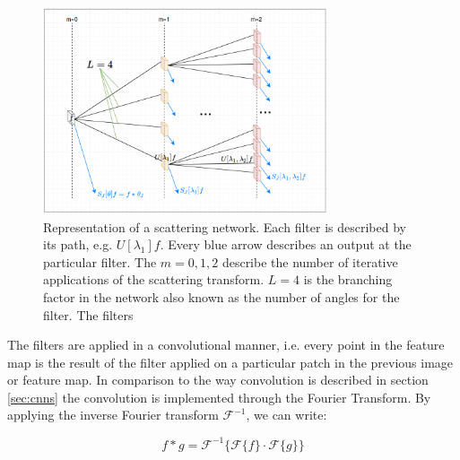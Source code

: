 \begin{figure}[!htb]
	\centering
	\includegraphics[width = 0.75\textwidth]{images/scattering_network_overview.png}
	\caption{Representation of a scattering network. Each filter is described by its path, e.g. $U[\lambda_1]f$. Every blue arrow describes an output at the particular filter. The $m=0,1,2$ describe the number of iterative applications of the scattering transform. $L=4$ is the branching factor in the network also known as the number of angles for the filter. The filters}
	\label{fig:scattering_network}
\end{figure}

The filters are applied in a convolutional manner, i.e. every point in the feature map is the result of the filter applied on a particular patch in the previous image or feature map. In comparison to the way convolution is described in section \ref{sec:cnns} the convolution is implemented through the Fourier Transform. By applying the inverse Fourier transform  ${\mathcal F}^{-1}$, we can write:

$$ f*g={\mathcal {F}}^{-1}{\big \{}{\mathcal {F}}\{f\}\cdot {\mathcal {F}}\{g\}{\big \}}$$

